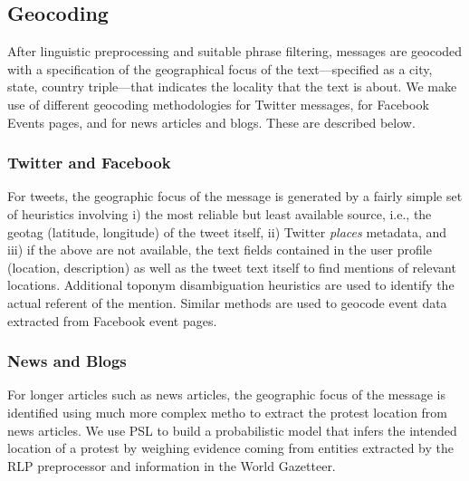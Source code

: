 \subsection{Geocoding}
\label{subsection:geocoding}
After linguistic preprocessing and suitable phrase filtering,
messages are geocoded with a
specification of the geographical focus of the text---specified as a
city, state, country triple---that indicates the locality that the
text is about. We make use of different geocoding methodologies
for Twitter messages, for Facebook Events pages, and for news articles and blogs.
These are described below.

\subsubsection{Twitter and Facebook}
For tweets, the geographic focus of the message is generated by a fairly simple
set of heuristics involving i) the most reliable but least available
source, i.e., the geotag (latitude, longitude) of the tweet itself, ii)
Twitter {\it places} metadata, and iii) if the above are not available,
the text fields contained in the user profile (location, description) as
well as the tweet text itself to find mentions of relevant locations.
Additional toponym disambiguation heuristics are used to identify the
actual referent of the mention.  Similar methods are used to geocode
event data extracted from Facebook event pages.  

\subsubsection{News and Blogs}
For longer articles such as news articles, the geographic focus of the message
is identified using much more complex metho to extract the protest
location from news articles. We use PSL to build a probabilistic model
that infers the intended location of a protest by weighing evidence
coming from entities extracted by the RLP preprocessor and information in the World
Gazetteer. 

